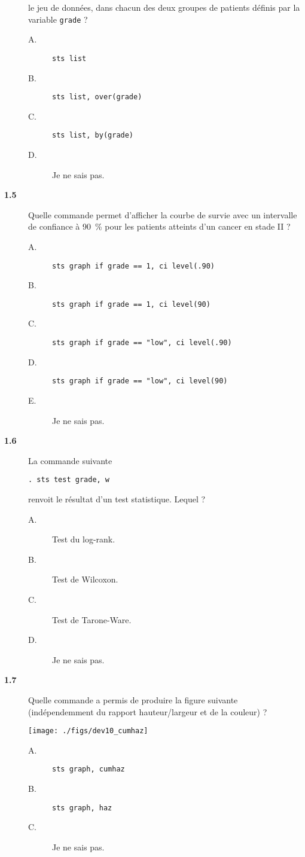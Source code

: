 \begin{description}
  le jeu de données, dans chacun des deux groupes de patients définis par la
  variable \texttt{grade} ?  
\begin{description}
\item[A.] \verb|sts list|
\item[B.] \verb|sts list, over(grade)|
\item[C.] \verb|sts list, by(grade)|
\item[D.] Je ne sais pas.
\end{description}
\item[\bf 1.5] Quelle commande permet d'afficher la courbe de survie avec un
  intervalle de confiance à 90~\% pour les patients atteints d'un cancer en
  stade II ? 
\begin{description}
\item[A.] \verb|sts graph if grade == 1, ci level(.90)|
\item[B.] \verb|sts graph if grade == 1, ci level(90)|
\item[C.] \verb|sts graph if grade == "low", ci level(.90)|
\item[D.] \verb|sts graph if grade == "low", ci level(90)|
\item[E.] Je ne sais pas.
\end{description}
\item[\bf 1.6] La commande suivante 
\begin{verbatim}
. sts test grade, w
\end{verbatim}
renvoit le résultat d'un test statistique. Lequel ?
\begin{description}
\item[A.] Test du log-rank.
\item[B.] Test de Wilcoxon.
\item[C.] Test de Tarone-Ware.
\item[D.] Je ne sais pas.
\end{description}
\item[\bf 1.7] Quelle commande a permis de produire la figure suivante
  (indépendemment du rapport hauteur/largeur et de la couleur) ?
  \begin{center}
    \texttt{[image: ./figs/dev10\_cumhaz]}
  \end{center}
\begin{description}
\item[A.] \verb|sts graph, cumhaz|
\item[B.] \verb|sts graph, haz|
\item[C.] Je ne sais pas.
\end{description}
\end{description}

